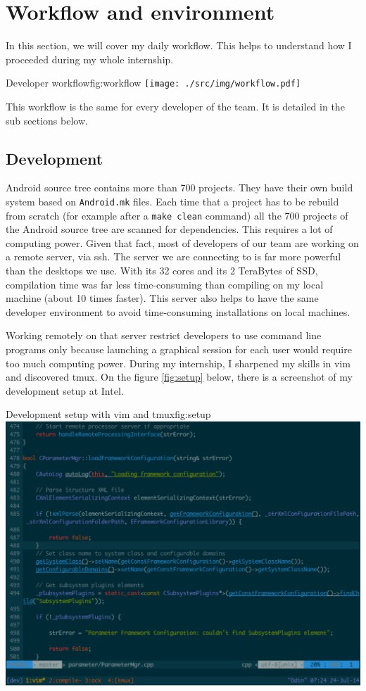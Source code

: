 \section{Workflow and environment}
In this section, we will cover my daily workflow. This helps
to understand how I proceeded during my whole internship.

\begin{figureGraphics}{Developer workflow}{fig:workflow}
    \texttt{[image: ./src/img/workflow.pdf]}
\end{figureGraphics}

This workflow is the same for every developer of the team. It is
detailed in the sub sections below.

\subsection{Development}
Android source tree contains more than 700 projects. They have their own build system
based on \lstinline{Android.mk} files. Each time that a project has to be rebuild from scratch (for example after a  \lstinline{make clean} command) all
the 700 projects of the Android source tree are scanned for dependencies. This requires a lot of computing power.
Given that fact, most of developers of our team are working on a remote server, via ssh.
The server we are connecting to is far more powerful than the desktops we use.
With its 32 cores and its 2 TeraBytes of SSD, compilation time was far less time-consuming
than compiling on my local machine (about 10 times faster).
This server also helps to have the same developer environment to avoid
time-consuming installations on local machines.

Working remotely on that server restrict developers to use command line programs only because
launching a graphical session for each user would require too much computing power.
During my internship, I sharpened my skills in \gls{vim} and discovered \gls{tmux}.
On the figure \ref{fig:setup} below, there is a screenshot of my development setup at Intel.

\begin{figureGraphics}{Development setup with vim and tmux}{fig:setup}
\includegraphics[width=\textwidth]{./src/img/setup.pdf}
\end{figureGraphics}


